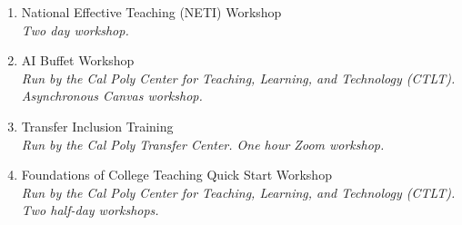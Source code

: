 \begin{workshops}
\iftoggle{wpaf}{%
	\section{\texorpdfstring{Teaching- \\[\baselineskip] Related \\ Activities}{Teaching-Related Activities}}
	\hfill\vspace*{-3\baselineskip}
}{%
	\section{\texorpdfstring{Workshops \\[\baselineskip] Attended}{Workshops Attended}}
	\hfill\vspace*{-2\baselineskip}
}
	\begin{enumerate}[label=\arabic*.]
		\item National Effective Teaching (NETI) Workshop  \\
		\textit{Two day workshop.}
		\item AI Buffet Workshop  \\
		\textit{Run by the Cal Poly Center for Teaching, Learning, and Technology (CTLT). Asynchronous Canvas workshop.}
		\item Transfer Inclusion Training  \\
		\textit{Run by the Cal Poly Transfer Center. One hour Zoom workshop.}
		\item Foundations of College Teaching Quick Start Workshop  \\
		\textit{Run by the Cal Poly Center for Teaching, Learning, and Technology (CTLT). Two half-day workshops.}
	\end{enumerate}
\end{workshops}
